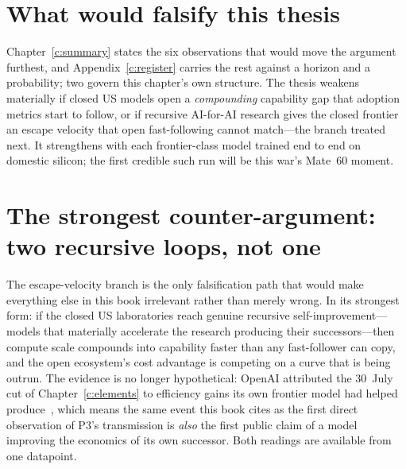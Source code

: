 \section{What would falsify this thesis}
\label{c:falsify}

Chapter~\ref{c:summary} states the six observations that would move the argument furthest, and Appendix~\ref{c:register} carries the rest against a horizon and a probability; two govern this chapter's own structure. The thesis weakens materially if closed US models open a \emph{compounding} capability gap that adoption metrics start to follow, or if recursive AI-for-AI research gives the closed frontier an escape velocity that open fast-following cannot match---the branch treated next. It strengthens with each frontier-class model trained end to end on domestic silicon; the first credible such run will be this war's Mate~60 moment.

\section{The strongest counter-argument: two recursive loops, not one}

The escape-velocity branch is the only falsification path that would make everything else in this book irrelevant rather than merely wrong. In its strongest form: if the closed US laboratories reach genuine recursive self-improvement---models that materially accelerate the research producing their successors---then compute scale compounds into capability faster than any fast-follower can copy, and the open ecosystem's cost advantage is competing on a curve that is being outrun. The evidence is no longer hypothetical: OpenAI attributed the 30~July cut of Chapter~\ref{c:elements} to efficiency gains its own frontier model had helped produce~\cite{openai-cut,berman2026}, which means the same event this book cites as the first direct observation of P3's transmission is \emph{also} the first public claim of a model improving the economics of its own successor. Both readings are available from one datapoint.

